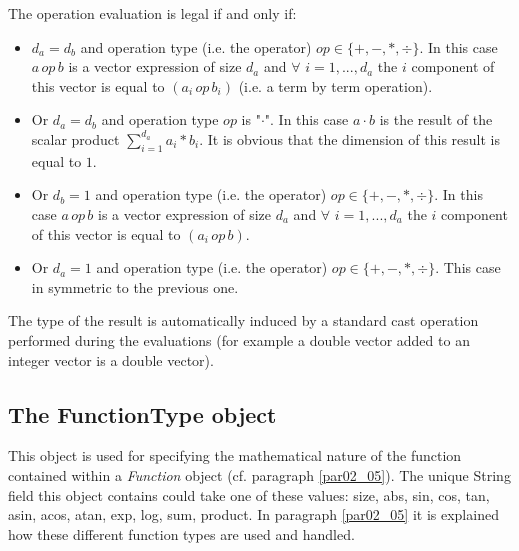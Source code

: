 \documentclass[a4paper,11pt] {ivoa}
\begin{document}
The operation evaluation is legal if and only if:
\begin{itemize}
\item $d_a=d_b$ and operation type (i.e. the operator) $op \in \{ + , - , \ast , \div \}$. In this
case $a \, op \, b$ is a vector expression of size $d_a$ and $\forall$ $i=1,...,d_a$ the $i$
component of this vector is equal to $(a_i \, op \,b_i)$ (i.e. a term by term operation).
\item Or $d_a = d_b$ and operation type $op$ is "$\cdot$". In this case $a \cdot b$ is the result of
the scalar product $\sum_{i =1}^{d_a} a_i \ast b_i$. It is obvious that the dimension of this result
is equal to $1$.
\item Or $d_b=1$ and operation type (i.e. the operator) $op \in \{ + , - , \ast , \div \}$. In this
case $a \, op \, b$ is a vector expression of size $d_a$ and $\forall$ $i=1,...,d_a$ the $i$
component of this vector is equal to $(a_i \, op \,b)$.
\item Or $d_a=1$ and operation type (i.e. the operator) $op \in \{ + , - , \ast , \div \}$. This
case in symmetric to the previous one.
\end{itemize}

The type of the result is automatically induced by a standard cast operation performed during the
evaluations (for example a double vector added to an integer vector is a double vector).

\subsection{The FunctionType object}\label{par-FunctionType}
This object is used for specifying the mathematical nature of the function contained within a {\it
Function} object (cf. paragraph \ref{par02_05}). The unique String field this object contains could
take one of these values:
size, abs, sin, cos, tan, asin, acos, atan, exp, log, sum, product. In paragraph \ref{par02_05} it
is explained how these different function types are used and handled.
\end{document}
